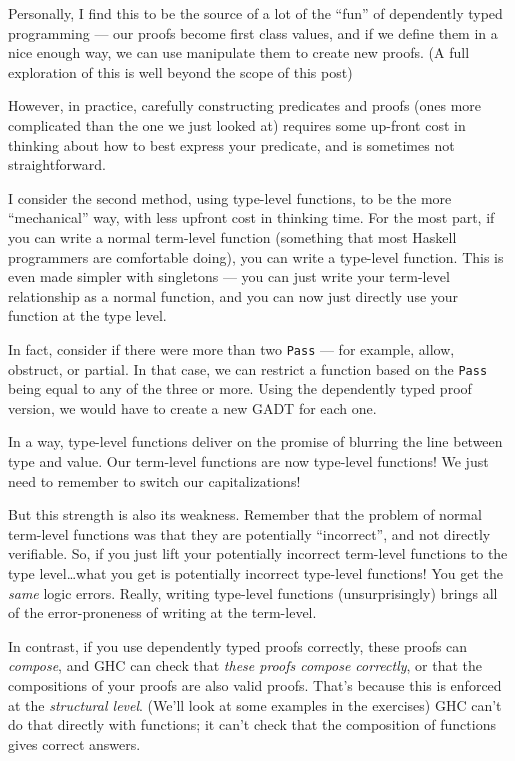\documentclass[]{article}
\begin{document}
Personally, I find this to be the source of a lot of the ``fun'' of dependently
typed programming --- our proofs become first class values, and if we define
them in a nice enough way, we can use manipulate them to create new proofs. (A
full exploration of this is well beyond the scope of this post)

However, in practice, carefully constructing predicates and proofs (ones more
complicated than the one we just looked at) requires some up-front cost in
thinking about how to best express your predicate, and is sometimes not
straightforward.

I consider the second method, using type-level functions, to be the more
``mechanical'' way, with less upfront cost in thinking time. For the most part,
if you can write a normal term-level function (something that most Haskell
programmers are comfortable doing), you can write a type-level function. This is
even made simpler with singletons --- you can just write your term-level
relationship as a normal function, and you can now just directly use your
function at the type level.

In fact, consider if there were more than two \texttt{Pass} --- for example,
allow, obstruct, or partial. In that case, we can restrict a function based on
the \texttt{Pass} being equal to any of the three or more. Using the dependently
typed proof version, we would have to create a new GADT for each one.

In a way, type-level functions deliver on the promise of blurring the line
between type and value. Our term-level functions are now type-level functions!
We just need to remember to switch our capitalizations!

But this strength is also its weakness. Remember that the problem of normal
term-level functions was that they are potentially ``incorrect'', and not
directly verifiable. So, if you just lift your potentially incorrect term-level
functions to the type level\ldots{}what you get is potentially incorrect
type-level functions! You get the \emph{same} logic errors. Really, writing
type-level functions (unsurprisingly) brings all of the error-proneness of
writing at the term-level.

In contrast, if you use dependently typed proofs correctly, these proofs can
\emph{compose}, and GHC can check that \emph{these proofs compose correctly}, or
that the compositions of your proofs are also valid proofs. That's because this
is enforced at the \emph{structural level}. (We'll look at some examples in the
exercises) GHC can't do that directly with functions; it can't check that the
composition of functions gives correct answers.
\end{document}
